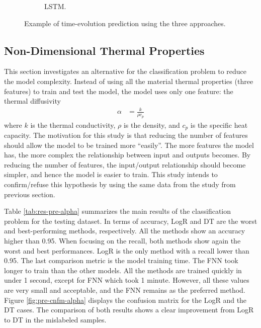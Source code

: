 \begin{figure}[htbp!]
\begin{subfigure}[b]{0.49\textwidth}
    \caption{LSTM.}
  \end{subfigure}
  \caption{Example of time-evolution prediction using the three approaches.}
  \label{fig:t-evol}
\end{figure}


\subsection{Non-Dimensional Thermal Properties}

This section investigates an alternative for the classification problem to reduce the model complexity.
Instead of using all the material thermal properties (three features) to train and test the model, the model uses only one feature: the thermal diffusivity
\begin{align}
\alpha &= \frac{k}{\rho c_p}
\end{align}
where $k$ is the thermal conductivity, $\rho$ is the density, and $c_p$ is the specific heat capacity.
The motivation for this study is that reducing the number of features should allow the model to be trained more ``easily''.
The more features the model has, the more complex the relationship between input and outputs becomes.
By reducing the number of features, the input/output relationship should become simpler, and hence the model is easier to train.
This study intends to confirm/refuse this hypothesis by using the same data from the study from previous section.

Table \ref{tab:res-pre-alpha} summarizes the main results of the classification problem for the testing dataset.
In terms of accuracy, LogR and DT are the worst and best-performing methods, respectively.
All the methods show an accuracy higher than 0.95.
When focusing on the recall, both methods show again the worst and best performances.
LogR is the only method with a recall lower than 0.95.
The last comparison metric is the model training time.
The FNN took longer to train than the other models.
All the methods are trained quickly in under 1 second, except for FNN which took 1 minute.
However, all these values are very small and acceptable, and the FNN remains as the preferred method.
Figure \ref{fig:pre-cnfm-alpha} displays the confusion matrix for the LogR and the DT cases.
The comparison of both results shows a clear improvement from LogR to DT in the mislabeled samples.

